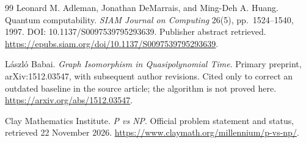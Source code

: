\begin{thebibliography}{99}
Leonard M. Adleman, Jonathan DeMarrais, and Ming-Deh A. Huang. Quantum computability. \emph{SIAM Journal on Computing} 26(5), pp.~1524--1540, 1997. DOI: 10.1137/S0097539795293639. Publisher abstract retrieved.
\url{https://epubs.siam.org/doi/10.1137/S0097539795293639}.

L\'aszl\'o Babai. \emph{Graph Isomorphism in Quasipolynomial Time}. Primary preprint, arXiv:1512.03547, with subsequent author revisions. Cited only to correct an outdated baseline in the source article; the algorithm is not proved here.
\url{https://arxiv.org/abs/1512.03547}.

Clay Mathematics Institute. \emph{P vs NP}. Official problem statement and status, retrieved 22 November 2026.
\url{https://www.claymath.org/millennium/p-vs-np/}.
\end{thebibliography}
